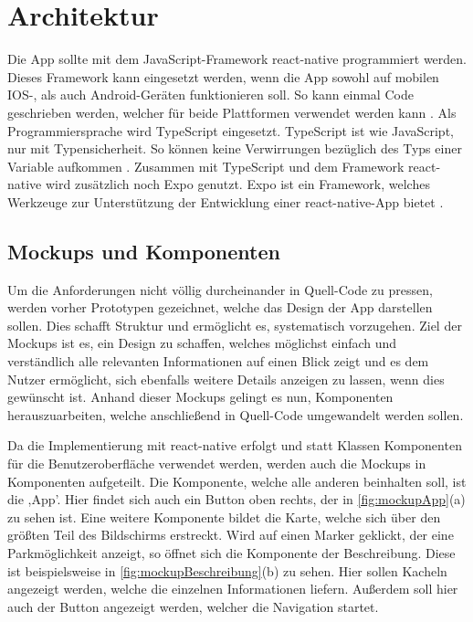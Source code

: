 \chapter{Architektur}

Die App sollte mit dem JavaScript-Framework react-native programmiert werden. Dieses Framework kann eingesetzt werden, wenn die App sowohl auf mobilen IOS-, als auch Android-Geräten funktionieren soll. So kann einmal Code geschrieben werden, welcher für beide Plattformen verwendet werden kann \cite{whyReactNative}. Als Programmiersprache wird TypeScript eingesetzt. TypeScript ist wie JavaScript, nur mit Typensicherheit. So können keine Verwirrungen bezüglich des Typs einer Variable aufkommen \cite{whyTypeScript}. Zusammen mit TypeScript und dem Framework react-native wird zusätzlich noch Expo genutzt. Expo ist ein Framework, welches Werkzeuge zur Unterstützung der Entwicklung einer react-native-App bietet \cite{whyExpo}. 

\section{Mockups und Komponenten}
Um die Anforderungen nicht völlig durcheinander in Quell-Code zu pressen, werden vorher Prototypen gezeichnet, welche das Design der App darstellen sollen. Dies schafft Struktur und ermöglicht es, systematisch vorzugehen. Ziel der Mockups ist es, ein Design zu schaffen, welches möglichst einfach und verständlich alle relevanten Informationen auf einen Blick zeigt und es dem Nutzer ermöglicht, sich ebenfalls weitere Details anzeigen zu lassen, wenn dies gewünscht ist. Anhand dieser Mockups gelingt es nun, Komponenten herauszuarbeiten, welche anschließend in Quell-Code umgewandelt werden sollen.

Da die Implementierung mit react-native erfolgt und statt Klassen Komponenten für die Benutzeroberfläche verwendet werden, werden auch die Mockups in Komponenten aufgeteilt. Die Komponente, welche alle anderen beinhalten soll, ist die ,App'. Hier findet sich auch ein Button oben rechts, der in \autoref{fig:mockupApp}(a) zu sehen ist. Eine weitere Komponente bildet die Karte, welche sich über den größten Teil des Bildschirms erstreckt. Wird auf einen Marker geklickt, der eine Parkmöglichkeit anzeigt, so öffnet sich die Komponente der Beschreibung. Diese ist beispielsweise in \autoref{fig:mockupBeschreibung}(b) zu sehen. Hier sollen Kacheln angezeigt werden, welche die einzelnen Informationen liefern. Außerdem soll hier auch der Button angezeigt werden, welcher die Navigation startet. 

